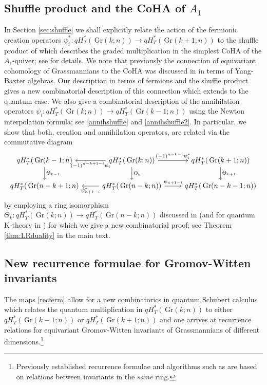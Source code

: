 \documentclass[12pt]{amsart}
\newcommand{\Gr}{\,\mathrm{Gr}}
\numberwithin{equation}{section}
\numberwithin{figure}{section}
\begin{document}
\subsection{Shuffle product and the CoHA of $A_1$}
In Section \ref{sec:shuffle} we shall explicitly relate the action of the  fermionic creation operators $\psi_i^*:qH^*_T(\Gr(k;n))\to qH^*_T(\Gr(k+1;n))$ to the shuffle product of \cite{feigin1995vector} which describes the graded multiplication in the simplest CoHA of the $A_1$-quiver; see \cite{kontsevich2011cohomological} for details. We note that previously the connection of equivariant cohomology of Grassmannians to the CoHA was discussed in \cite[Section 8]{GKS20} in terms of Yang-Baxter algebras. Our description in terms of fermions and the shuffle product gives a new combinatorial description of this connection which extends to the quantum case. We also give a combinatorial description of the annihilation operators $\psi_i:qH^*_T(\Gr(k;n))\to qH^*_T(\Gr(k-1;n))$ using the Newton interpolation formula; see \eqref{annihshuffle} and \eqref{annihshuffle2}. In particular, we show that both, creation and annihilation operators, are related via the commutative diagram 
\begin{equation}\label{LRcd}
    \begin{tikzcd}
         qH^*_T(\Gr(k-1;n)\arrow[d,"\Theta_{k-1}"]  &\arrow[l,"(-1)^{n-k+1-i}\psi_i"] qH^*_T(\Gr(k;n)) \arrow[d,"\Theta_k"] \arrow[r, "(-1)^{n-k-i}\psi^*_i"] &  qH^*_T(\Gr(k +1; n)) \arrow[d, "\Theta_{k+1}"]  \\
        qH^*_T(\Gr(n-k+1;n)&\arrow[l,"\psi^*_{n+1-i}"]  qH^*_T(\Gr(n-k;n)) \arrow[r, "\psi_{n+1-i}"] &  qH^*_T(\Gr(n-k-1; n))
    \end{tikzcd}
    \end{equation}
by employing a ring isomorphism $\Theta_k:qH^*_T(\Gr(k;n))\to qH^*_T(\Gr(n-k;n))$ discussed in \cite[Cor. 6.8]{gorbounovkorff2014} (and for quantum K-theory in \cite[Cor. 4.14]{gorbounov2017quantum}) for which we give a new combinatorial proof; see Theorem \ref{thm:LRduality} in the main text.

\subsection{New recurrence formulae for Gromov-Witten invariants}
The maps \eqref{recferm} allow for a new combinatorics in quantum Schubert calculus which relates the quantum multiplication in $qH^*_T(\Gr(k;n))$ to either $qH^*_T(\Gr(k-1;n))$ or $qH^*_T(\Gr(k+1;n))$ and one arrives at recurrence relations for equivariant Gromov-Witten invariants of Grassmannians of different dimensions.\footnote{Previously established recurrence formulae and algorithms such as \cite[Prop.5.1 and Thm 2]{MihalceaAIM} are based on relations between invariants in the {\em same} ring.} 
\end{document}
